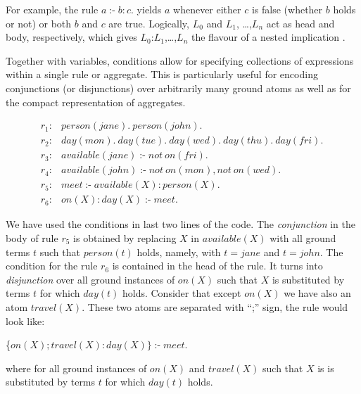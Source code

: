 \documentclass[a4paper, titlepage]{article}
\DeclareMathOperator{\leftimpl}{:-}
\begin{document}
For example, the rule $\mathit{a \leftimpl b : c.}$ yields 
$a$ whenever either $c$ is false (whether $b$ holds or not) 
or both $b$ and $c$ are true. Logically, $L_0$ and $L_1$,
\dots,$L_n$ act as head and body, respectively, which gives 
$L_0$:$L_1$,\dots,$L_n$ the flavour of a nested implication 
\cite{pott}.

Together  with variables, conditions allow for specifying 
collections of expressions within a single rule or 
aggregate. This is particularly useful for encoding 
conjunctions (or disjunctions) over arbitrarily many ground 
atoms as well as for the compact representation of 
aggregates. 
\begin{exmp}
\begin{align*}
r_1\colon& \mathit{person}(\mathit{jane}). \  \mathit{person}
(\mathit{john}).\\
r_2\colon& \mathit{day}(\mathit{mon}). \ \mathit{day}
(\mathit{tue}). \ \mathit{day}(\mathit{wed}). \ \mathit{day}
(\mathit{thu}). \ \mathit{day}(\mathit{fri}). \ \\
r_3\colon& \mathit{available}(\mathit{jane}) \leftimpl not \  
\mathit{on}(\mathit{fri}).\\
r_4\colon& \mathit{available}(\mathit{john}) \leftimpl 
\mathit{not} \ \mathit{on}(\mathit{mon}), \mathit{not} \ 
\mathit{on}(\mathit{wed}).\\
r_5\colon& \mathit{meet} \leftimpl \mathit{available}(X) : 
\mathit{person}(X).\\
r_6\colon& \mathit{on}(X) : \mathit{day}(X) \leftimpl 
\mathit{meet}.
\end{align*}
\end{exmp}  
We have used the conditions in last two lines of the code. 
The \emph{conjunction} in the body of rule $r_5$ is obtained by 
replacing $X$ in $\mathit{available(X)}$ with all ground 
terms $t$ such that $\mathit{person(t)}$ holds, namely, 
with $\mathit{t=jane}$ and $\mathit{t=john}$. The condition 
for the rule $r_6$ is contained in the head of the rule. It 
turns into \emph{disjunction} over all ground instances of 
$\mathit{on(X)}$ such that $X$ is substituted by terms $t$ 
for which $\mathit{day(t)}$ holds. Consider that except $\mathit{on(X)}$ we have also an atom $\mathit{travel(X)}$. These two atoms are separated with ``;'' sign, the rule would look like:
\centerline{\{$\mathit{on}(X);\mathit{travel}(X) : \mathit{day}(X)\} \leftimpl 
\mathit{meet}.$}
where for all ground instances of $\mathit{on(X)}$ and $\mathit{travel(X)}$ such that $X$ is is substituted by terms $t$ for which $\mathit{day(t)}$ holds. 
\end{document}
